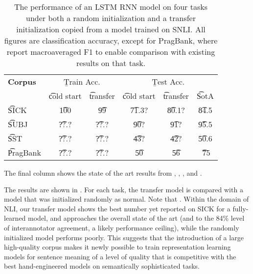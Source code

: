 \noindent{}


\begin{table}
\begin{center}
\begin{tabular}{l@{\hskip \colspaceL}c@{\hskip \colspaceS}c@{\hskip \colspaceS}c@{\hskip \colspaceS}c@{\hskip \colspaceS}c}
\hline
\textbf{Corpus} & \multicolumn{2}{c}{\b{Train Acc.}} &\multicolumn{3}{c}{ \b{Test Acc.}} \\
 & \t{cold start} & \t{transfer} & \t{cold start} & \t{transfer} & \t{SotA} \\
\hline
\t{SICK}            & \t{100} & \t{99} & \t{71.3?} & \t{80.1?} & \t{84.5} \\
\t{SUBJ}          & \t{??.?} & \t{??.?} & \t{90?} & \t{91?}& \t{95.5} \\
\t{SST}          & \t{??.?} & \t{??.?} & \t{43?} & \t{42?} & \t{50.6}\\
\t{PragBank}          & \t{??.?} & \t{??.?} & \t{50} & \t{56}& \t{~75} \\
\hline
\end{tabular}
\end{center}

\caption{\label{tab:transferresults}
The performance of an LSTM RNN model on four tasks under both a random initialization and a transfer initialization copied from a model trained on SNLI. All figures are classification accuracy, except for PragBank, where report macroaveraged F1 to enable comparison with existing results on that task. } 

\end{table}

The final column shows the state of the art results from \citealt{lai2014illinois}, \citealt{zhao2015self}, \citealt{tai2015improved}, and .

The results are shown in . For each task, the transfer model is compared with a model that was initialized randomly as normal. Note that . Within the domain of NLI, our transfer model shows the best number yet reported on SICK for a fully-learned model, and approaches the overall state of the art (and to the 84\% level of interannotator agreement, a likely performance ceiling), while the randomly initialized model performs poorly. This suggests that the introduction of a large high-quality corpus makes it newly possible to train representation learning models for sentence meaning of a level of quality that is competitive with the best hand-engineered models on semantically sophisticated tasks.

\noindent{}